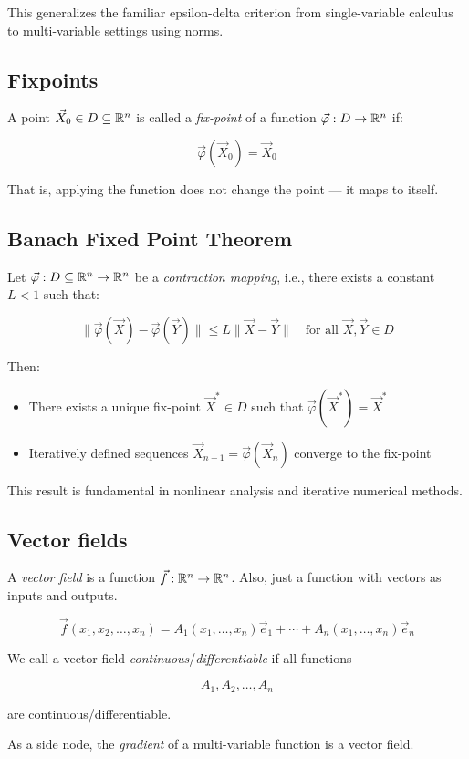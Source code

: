 This generalizes the familiar epsilon-delta criterion from single-variable calculus to multi-variable 
settings using norms.

\subsection{Fixpoints}
  
A point \( \vec{X}_0 \in D \subseteq \mathbb{R}^n \) is called a \emph{fix-point} of a function 
\( \vec{\varphi} : D \to \mathbb{R}^n \) if:

\[
    \vec{\varphi}(\vec{X}_0) = \vec{X}_0
\]

That is, applying the function does not change the point — it maps to itself.

\subsection{Banach Fixed Point Theorem}

Let \( \vec{\varphi} : D \subseteq \mathbb{R}^n \to \mathbb{R}^n \) be a \emph{contraction mapping}, 
i.e., there exists a constant \( L < 1 \) such that:

\[
    \|\vec{\varphi}(\vec{X}) - \vec{\varphi}(\vec{Y})\| \le L \|\vec{X} - \vec{Y}\| \quad 
    \text{for all } \vec{X}, \vec{Y} \in D
\]

Then:

\begin{itemize}
    \item There exists a unique fix-point \( \vec{X}^* \in D \) such that 
    \( \vec{\varphi}(\vec{X}^*) = \vec{X}^* \)
    \item Iteratively defined sequences \( \vec{X}_{n+1} = \vec{\varphi}(\vec{X}_n) \) converge to the 
    fix-point
\end{itemize}

This result is fundamental in nonlinear analysis and iterative numerical methods.

\subsection{Vector fields}

A \emph{vector field} is a function \(\vec{f}: \mathbb{R}^n \to \mathbb{R}^n\). Also, just a 
function with vectors as inputs and outputs.

\[
    \vec{f}(x_1, x_2, \dots, x_n) = A_1(x_1, \dots, x_n)\vec{e}_1 + \cdots + A_n(x_1, \dots, x_n)\vec{e}_n
\]

We call a vector field \emph{continuous}/\emph{differentiable} if all functions 

\[
    A_1, A_2, \dots, A_n
\] 

are continuous/differentiable.
\vspace{\baselineskip}

As a side node, the \emph{gradient} of a multi-variable function is a vector field.



